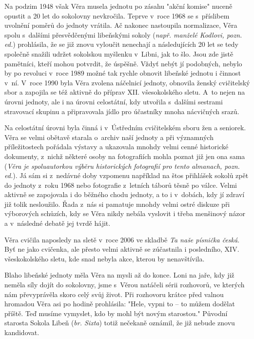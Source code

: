 \documentclass[a5paper, 12pt, twoside]{article}
\begin{document}
Na podzim 1948 však Věra musela jednotu po zásahu "akční komise" nuceně
opustit a 20 let do sokolovny nevkročila. Teprve v~roce 1968 se
s~příslibem uvolnění poměrů do jednoty vrátila. Ač nakonec nastoupila
normalizace, Věra spolu s~dalšími přesvědčenými libeňskými sokoly
(\textit{např. manželé Kodlovi, pozn. ed.}) prohlásila, že se již znovu
vyloučit nenechají a následujících 20 let se tedy společně snažili
udržet sokolskou myšlenku v~Libni, jak to šlo. Jsou zde jistě pamětníci,
kteří mohou potvrdit, že úspěšně. Vždyť nebýt jí podobných, nebylo by po
revoluci v~roce 1989 možné tak rychle obnovit libeňské jednotu i činnost
v~ní. V~roce 1990 byla Věra zvolena náčelnicí jednoty, obnovila ženský
cvičitelský sbor a zapojila se též aktivně do příprav XII. všesokolského
sletu. A~to nejen na úrovni jednoty, ale i na úrovni celostátní, kdy
utvořila s~dalšími sestrami stravovací skupinu a připravovala jídlo pro
účastníky mnoha nácvičných srazů.

Na celostátní úrovni byla činná i v~Ústředním cvičitelském sboru žen a
seniorek. Věra se velmi obětavě starala o~archiv naší jednoty a při
významných příležitostech pořádala výstavy a ukazovala mnohdy velmi
cenné historické dokumenty, z~nichž některé osoby na fotografiích mohla
poznat již jen ona sama (\textit{Věra je spoluautorkou výběru historických
fotografií pro tento almanach, pozn. ed.}). Já sám si z~nedávné doby
vzpomenu například na štos přihlášek sokolů zpět do jednoty z~roku 1968
nebo fotografie z~letních táborů těsně po válce. Velmi aktivně se
zapojovala i do běžného chodu jednoty, a to i v~dobách, kdy jí zdraví
již tolik nesloužilo. Řada z~nás si pamatuje mnohdy velmi ostré diskuze
při výborových schůzích, kdy se Věra nikdy nebála vyslovit i třeba
menšinový názor a v~následné debatě jej tvrdě hájit.

Věra cvičila naposledy na sletě v~roce 2006 ve skladbě \textit{Ta naše
písnička česká}. Byť ne jako cvičenka, ale přesto velmi aktivně se
zúčastnila i posledního, XIV. všeskokolského sletu, kde snad nebyla
akce, kterou by nenavštívila.

Blaho libeňské jednoty měla Věra na mysli až do konce. Loni na jaře, kdy
již neměla síly dojít do sokolovny, jsme s~Věrou natáčeli sérii
rozhovorů, ve kterých nám převyprávěla skoro celý svůj život. Při
rozhovoru krátce před valnou hromadou Věra asi po hodině prohlásila:
"Hele, vypni to -- to můžem dodělat příště. Teď musíme vymyslet, kdo by
mohl být novým starostou." Původní starosta Sokola Libeň (\textit{br.
Sixta}) totiž nečekaně oznámil, že již nebude znovu kandidovat.
\end{document}
